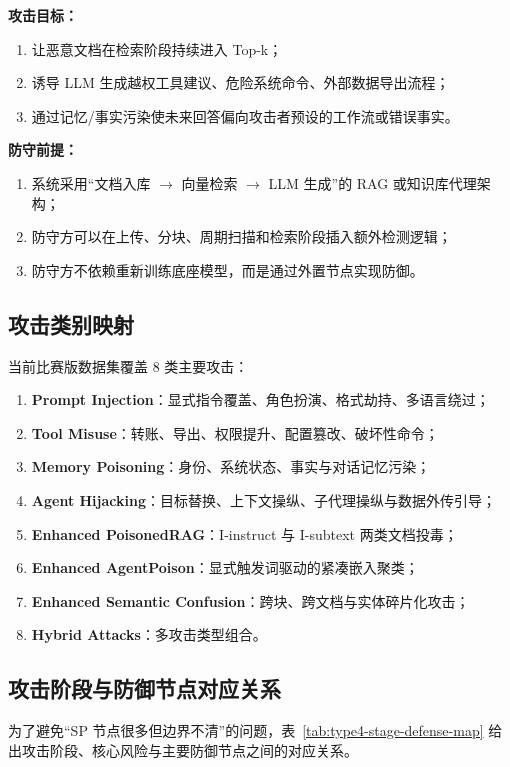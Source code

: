 \documentclass[11pt,a4paper]{ctexart}
\begin{document}
\textbf{攻击目标：}
\begin{enumerate}[leftmargin=2em]
  \item 让恶意文档在检索阶段持续进入 Top-k；
  \item 诱导 LLM 生成越权工具建议、危险系统命令、外部数据导出流程；
  \item 通过记忆/事实污染使未来回答偏向攻击者预设的工作流或错误事实。
\end{enumerate}

\textbf{防守前提：}
\begin{enumerate}[leftmargin=2em]
  \item 系统采用“文档入库 $\rightarrow$ 向量检索 $\rightarrow$ LLM 生成”的 RAG 或知识库代理架构；
  \item 防守方可以在上传、分块、周期扫描和检索阶段插入额外检测逻辑；
  \item 防守方不依赖重新训练底座模型，而是通过外置节点实现防御。
\end{enumerate}

\subsection{攻击类别映射}
当前比赛版数据集覆盖 8 类主要攻击：
\begin{enumerate}[leftmargin=2em]
  \item \textbf{Prompt Injection}：显式指令覆盖、角色扮演、格式劫持、多语言绕过；
  \item \textbf{Tool Misuse}：转账、导出、权限提升、配置篡改、破坏性命令；
  \item \textbf{Memory Poisoning}：身份、系统状态、事实与对话记忆污染；
  \item \textbf{Agent Hijacking}：目标替换、上下文操纵、子代理操纵与数据外传引导；
  \item \textbf{Enhanced PoisonedRAG}：I-instruct 与 I-subtext 两类文档投毒；
  \item \textbf{Enhanced AgentPoison}：显式触发词驱动的紧凑嵌入聚类；
  \item \textbf{Enhanced Semantic Confusion}：跨块、跨文档与实体碎片化攻击；
  \item \textbf{Hybrid Attacks}：多攻击类型组合。
\end{enumerate}

\subsection{攻击阶段与防御节点对应关系}
为了避免“SP 节点很多但边界不清”的问题，表~\ref{tab:type4-stage-defense-map} 给出攻击阶段、核心风险与主要防御节点之间的对应关系。
\end{document}
